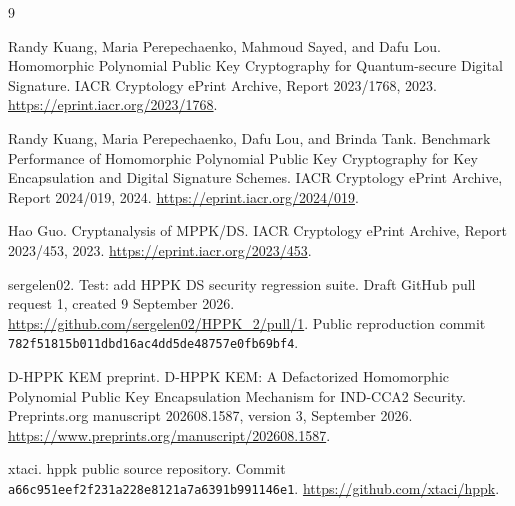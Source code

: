\documentclass[10pt,a4paper]{article}
\begin{document}
\begin{thebibliography}{9}

Randy Kuang, Maria Perepechaenko, Mahmoud Sayed, and Dafu Lou.
\newblock Homomorphic Polynomial Public Key Cryptography for Quantum-secure
Digital Signature.
\newblock IACR Cryptology ePrint Archive, Report 2023/1768, 2023.
\newblock \url{https://eprint.iacr.org/2023/1768}.

Randy Kuang, Maria Perepechaenko, Dafu Lou, and Brinda Tank.
\newblock Benchmark Performance of Homomorphic Polynomial Public Key
Cryptography for Key Encapsulation and Digital Signature Schemes.
\newblock IACR Cryptology ePrint Archive, Report 2024/019, 2024.
\newblock \url{https://eprint.iacr.org/2024/019}.

Hao Guo.
\newblock Cryptanalysis of MPPK/DS.
\newblock IACR Cryptology ePrint Archive, Report 2023/453, 2023.
\newblock \url{https://eprint.iacr.org/2023/453}.

sergelen02.
\newblock Test: add HPPK DS security regression suite.
\newblock Draft GitHub pull request 1, created 9 September 2026.
\newblock \url{https://github.com/sergelen02/HPPK_2/pull/1}.
\newblock Public reproduction commit
\texttt{782f51815b011dbd16ac4dd5de48757e0fb69bf4}.

D-HPPK KEM preprint.
\newblock D-HPPK KEM: A Defactorized Homomorphic Polynomial Public Key
Encapsulation Mechanism for IND-CCA2 Security.
\newblock Preprints.org manuscript 202608.1587, version 3, September 2026.
\newblock \url{https://www.preprints.org/manuscript/202608.1587}.

xtaci.
\newblock hppk public source repository.
\newblock Commit
\texttt{a66c951eef2f231a228e8121a7a6391b991146e1}.
\newblock \url{https://github.com/xtaci/hppk}.

\end{thebibliography}
\end{document}
